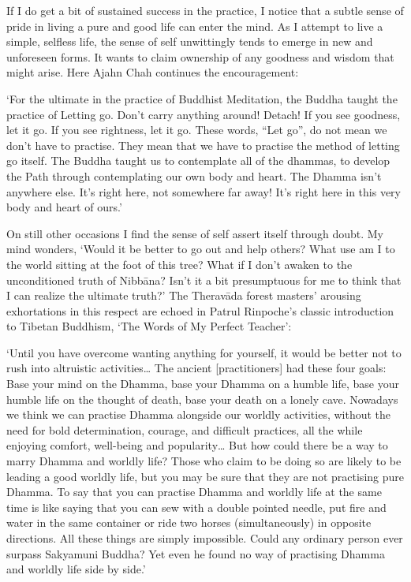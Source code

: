 If I do get a bit of sustained success in the practice, I notice that a
subtle sense of pride in living a pure and good life can enter the mind.
As I attempt to live a simple, selfless life, the sense of self
unwittingly tends to emerge in new and unforeseen forms. It wants to
claim ownership of any goodness and wisdom that might arise. Here Ajahn
Chah continues the encouragement:

`For the ultimate in the practice of Buddhist Meditation, the Buddha
taught the practice of Letting go. Don't carry anything around! Detach!
If you see goodness, let it go. If you see rightness, let it go. These
words, ``Let go'', do not mean we don't have to practise. They mean that
we have to practise the method of letting go itself. The Buddha taught
us to contemplate all of the dhammas, to develop the Path through
contemplating our own body and heart. The Dhamma isn't anywhere else.
It's right here, not somewhere far away! It's right here in this very
body and heart of ours.'

On still other occasions I find the sense of self assert itself through
doubt. My mind wonders, `Would it be better to go out and help others?
What use am I to the world sitting at the foot of this tree? What if I
don't awaken to the unconditioned truth of Nibbāna? Isn't it a bit
presumptuous for me to think that I can realize the ultimate truth?' The
Theravāda forest masters' arousing exhortations in this respect are
echoed in Patrul Rinpoche's classic introduction to Tibetan Buddhism,
`The Words of My Perfect Teacher':

`Until you have overcome wanting anything for yourself, it would be
better not to rush into altruistic activities\ldots{} The ancient
{[}practitioners{]} had these four goals: Base your mind on the Dhamma,
base your Dhamma on a humble life, base your humble life on the thought
of death, base your death on a lonely cave. Nowadays we think we can
practise Dhamma alongside our worldly activities, without the need for
bold determination, courage, and difficult practices, all the while
enjoying comfort, well-being and popularity\ldots{} But how could there
be a way to marry Dhamma and worldly life? Those who claim to be doing
so are likely to be leading a good worldly life, but you may be sure
that they are not practising pure Dhamma. To say that you can practise
Dhamma and worldly life at the same time is like saying that you can sew
with a double pointed needle, put fire and water in the same container
or ride two horses (simultaneously) in opposite directions. All these
things are simply impossible. Could any ordinary person ever surpass
Sakyamuni Buddha? Yet even he found no way of practising Dhamma and
worldly life side by side.'

